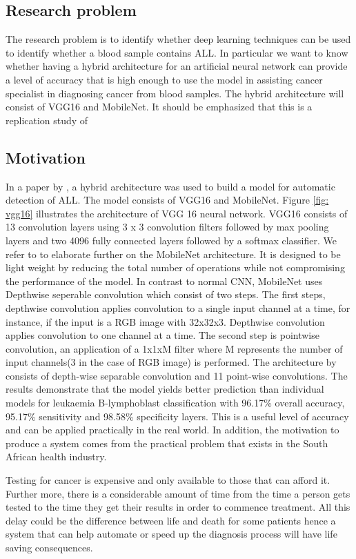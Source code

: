 \documentclass[a4paper,11pt]{article}
\begin{document}
\subsection{Research problem}
\label{problem}
The research problem is to identify whether deep learning techniques can be used to identify whether a blood sample contains ALL. In particular we want to know whether having a hybrid architecture for an artificial neural network can provide a level of accuracy that is high enough to use the model in assisting cancer specialist in diagnosing cancer from blood samples. The hybrid architecture will consist of VGG16 and MobileNet. It should be emphasized that this is a replication study of \cite{Sara} 
\subsection{Motivation}
\label{motivation}
In a paper by \cite{Sara}, a hybrid architecture was used to build a model for automatic detection of ALL. The model consists of VGG16 and MobileNet. Figure \ref{fig: vgg16} illustrates the architecture of VGG 16 neural network.  VGG16  consists of 13 convolution layers using 3 x 3 convolution filters followed by max pooling layers and two 4096 fully connected layers followed by a softmax classifier. We refer to \cite{Andrew} to elaborate further on the MobileNet architecture. It is designed to be light weight by reducing the total number of operations while not compromising the performance of the model. In contrast to normal CNN,  MobileNet uses Depthwise seperable convolution which consist of two steps. The first steps, depthwise convolution applies convolution to a single input channel at a time, for instance, if the input is a RGB image with 32x32x3. Depthwise convolution applies convolution to one channel at a time. The second step is pointwise convolution, an application of a 1x1xM filter where M represents the number of input channels(3 in the case of RGB image) is performed.  The architecture by \cite{Sara} consists of depth-wise separable convolution and 11 point-wise convolutions. The results demonstrate that the model yields better prediction than individual models for leukaemia B-lymphoblast classification with 96.17\% overall accuracy, 95.17\% sensitivity and 98.58\% specificity layers. This is a useful level of accuracy and can be applied practically in the real world. In addition, the motivation to produce a system comes from the practical problem that exists in the South African health industry.

Testing for cancer is expensive and only available to those that can afford it. Further more, there is a considerable amount of time from the time a person gets tested to the time they get their results in order to commence treatment. All this delay could be the difference between life and death for some patients hence a system that can help automate or speed up the diagnosis process will have life saving consequences.
\end{document}
